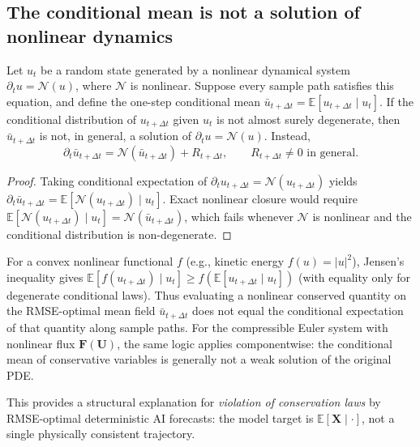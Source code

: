 
\subsection{The conditional mean is not a solution of nonlinear dynamics}
\label{subsec:nonclosure}

\begin{proposition}
\label{prop:nonlinear_nonclosure}
Let $u_t$ be a random state generated by a nonlinear dynamical system
$\partial_t u = \mathcal{N}(u)$,
where $\mathcal{N}$ is nonlinear.
Suppose every sample path satisfies this equation, and define the one-step conditional mean
$\bar u_{t+\Delta t}=\mathbb{E}[u_{t+\Delta t}\mid u_t]$.
If the conditional distribution of $u_{t+\Delta t}$ given $u_t$ is not almost surely degenerate,
then $\bar u_{t+\Delta t}$ is not, in general, a solution of $\partial_t u=\mathcal{N}(u)$. Instead,
\begin{equation}
    \partial_t \bar u_{t+\Delta t}
    =
    \mathcal{N}(\bar u_{t+\Delta t}) + R_{t+\Delta t},
    \qquad
    R_{t+\Delta t}\neq 0 \text{ in general}.
    \label{eq:closure_error}
\end{equation}
\end{proposition}

\begin{proof}
Taking conditional expectation of $\partial_t u_{t+\Delta t}=\mathcal{N}(u_{t+\Delta t})$ yields
$\partial_t \bar u_{t+\Delta t}=\mathbb{E}[\mathcal{N}(u_{t+\Delta t})\mid u_t]$.
Exact nonlinear closure would require
$\mathbb{E}[\mathcal{N}(u_{t+\Delta t})\mid u_t]=\mathcal{N}(\bar u_{t+\Delta t})$,
which fails whenever $\mathcal{N}$ is nonlinear and the conditional distribution is non-degenerate.
\end{proof}

\begin{remark}
\label{rem:jensen}
For a convex nonlinear functional $f$ (e.g., kinetic energy $f(u)=|u|^2$),
Jensen's inequality gives
$\mathbb{E}[f(u_{t+\Delta t})\mid u_t]\ge f(\mathbb{E}[u_{t+\Delta t}\mid u_t])$
(with equality only for degenerate conditional laws).
Thus evaluating a nonlinear conserved quantity on the RMSE-optimal mean field
$\bar u_{t+\Delta t}$ does not equal the conditional expectation of that quantity along sample paths.
For the compressible Euler system with nonlinear flux $\mathbf{F}(\mathbf{U})$,
the same logic applies componentwise: the conditional mean of conservative variables is generally
not a weak solution of the original PDE.
\end{remark}

This provides a structural explanation for \emph{violation of conservation laws} by RMSE-optimal deterministic AI forecasts: the model target is $\mathbb{E}[\mathbf{X}\mid\cdot]$, not a single physically consistent trajectory.
